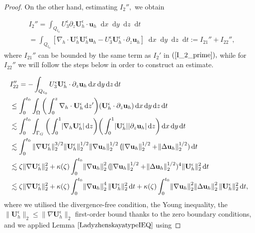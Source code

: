 \documentclass[12pt]{report}
\numberwithin{theorem}{chapter}
\numberwithin{corollary}{chapter}
\numberwithin{lemma}{chapter}
\numberwithin{remark}{chapter}
\numberwithin{definition}{chapter}
\numberwithin{prop}{chapter}
\newcommand*\diff{\mathop{}\!\mathrm{d}}
\begin{document}
\begin{proof}
  On the other hand, estimating $I_2'',$ we obtain
  
  \begin{equation}
    \begin{split}
      & I_2 '' = \int_{Q_{t_0}} U^\epsilon_3 \partial_z \mathbf{U}_h^\epsilon \cdot \mathbf{u}_h \diff x \diff y \diff z \diff t \\
      & =  \int_{Q_{t_0}} [\nabla_h \cdot \mathbf{U}_h^\epsilon \mathbf{U}_h^\epsilon \mathbf{u}_h - U^\epsilon_3 \mathbf{U}_h^\epsilon \cdot \partial_z \mathbf{u}_h ] \diff x \diff y \diff z \diff t := I_{21}'' + I_{22}'',
    \end{split}
  \end{equation}
%
where $I_{21}''$ can be bounded by the same term as $I_2'$ in $(\ref{I_2_prime}),$ while for $I_{22}''$ we will follow the steps below in order to construct an estimate.

  \begin{equation} \nonumber
    \begin{split}
      & I_{22}'' = - \int_{Q_{t_0}}  U^\epsilon_3 \mathbf{U}_h^\epsilon \cdot \partial_z \mathbf{u}_h \diff x \diff y \diff z \diff t \\
      & \leq \int_0^{t_0} \int_\Omega \bigg ( \int_0^z \nabla_h \cdot \mathbf{U}_h^\epsilon \diff z' \bigg ) (\mathbf{U}_h^\epsilon \cdot \partial_z \mathbf{u}_h) \diff x \diff y \diff z \diff t \\
      & \lesssim \int_0^{t_0} \int_{\Gamma_G} \bigg ( \int_0^1 \abs{\nabla_h \mathbf{U}_h^\epsilon} \diff z \bigg) \bigg ( \int_0^1 \abs{\mathbf{U}_h^\epsilon} \abs{\partial_z \mathbf{u}_h} \diff z \bigg ) \diff x \diff y \diff t \\
      & \lesssim \int_0^{t_0} \| \nabla \mathbf{U}_h^\epsilon \| _2^{3/2} \| \mathbf{U}_h^\epsilon \| _2^{1/2} \norm{\nabla \mathbf{u}_h}_2^{1/2} (\norm{\nabla \mathbf{u}_h}_2^{1/2} + \norm{\Delta \mathbf{u}_h}_2^{1/2}) \diff t \\
      & \lesssim \zeta \| \nabla \mathbf{U}_h^\epsilon \| ^2_2 + \kappa(\zeta) \int_0^{t_0} \norm{\nabla \mathbf{u}_h}_2^2 (\norm{\nabla \mathbf{u}_h}_2^{1/2} + \norm{\Delta \mathbf{u}_h}_2^{1/2})^4 \| \mathbf{U}_h^\epsilon \|_2^2 \diff t \\
      & \lesssim \zeta \| \nabla \mathbf{U}_h^\epsilon \| ^2_2 + \kappa(\zeta) \int_0^{t_0} \norm{\nabla \mathbf{u}_h}_2^4 \| \mathbf{U}_h^\epsilon \|_2^2 \diff t + \kappa(\zeta) \int_0^{t_0} \norm{\nabla \mathbf{u}_h}_2^2  \norm{\Delta \mathbf{u}_h}_2^2 \| \mathbf{U}_h^\epsilon \| _2^2 \diff t,
    \end{split}
  \end{equation}
%
where we utilised the divergence-free condition, the Young inequality, the $\| \mathbf{U}_h^\epsilon \|_2 \leq \| \nabla \mathbf{U}_h^\epsilon \|_2$ first-order bound thanks to the zero boundary conditions, and we applied Lemma $\ref{LadyzhenskayatypeIEQ}$ using
  

\end{proof}
\end{document}

